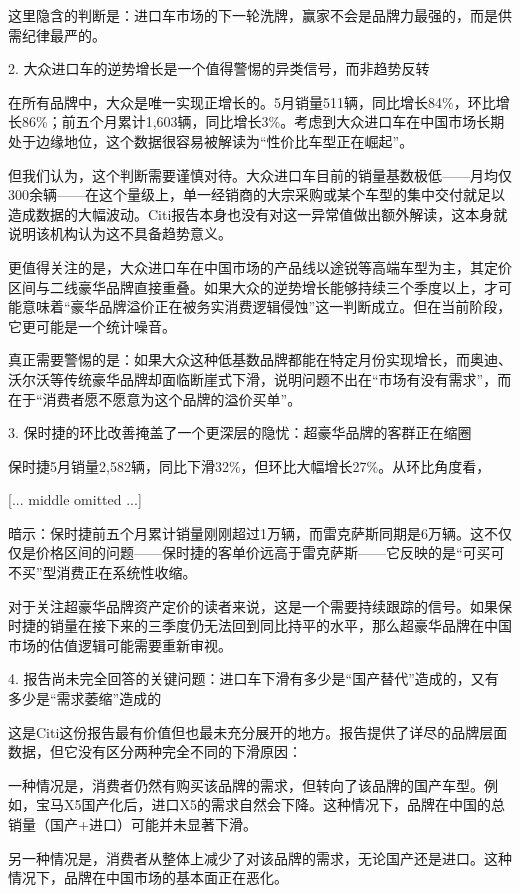 \documentclass[11pt]{ctexart}
\begin{document}
这里隐含的判断是：进口车市场的下一轮洗牌，赢家不会是品牌力最强的，而是供需纪律最严的。

2. 大众进口车的逆势增长是一个值得警惕的异类信号，而非趋势反转

在所有品牌中，大众是唯一实现正增长的。5月销量511辆，同比增长84\%，环比增长86\%；前五个月累计1,603辆，同比增长3\%。考虑到大众进口车在中国市场长期处于边缘地位，这个数据很容易被解读为“性价比车型正在崛起”。

但我们认为，这个判断需要谨慎对待。大众进口车目前的销量基数极低——月均仅300余辆——在这个量级上，单一经销商的大宗采购或某个车型的集中交付就足以造成数据的大幅波动。Citi报告本身也没有对这一异常值做出额外解读，这本身就说明该机构认为这不具备趋势意义。

更值得关注的是，大众进口车在中国市场的产品线以途锐等高端车型为主，其定价区间与二线豪华品牌直接重叠。如果大众的逆势增长能够持续三个季度以上，才可能意味着“豪华品牌溢价正在被务实消费逻辑侵蚀”这一判断成立。但在当前阶段，它更可能是一个统计噪音。

真正需要警惕的是：如果大众这种低基数品牌都能在特定月份实现增长，而奥迪、沃尔沃等传统豪华品牌却面临断崖式下滑，说明问题不出在“市场有没有需求”，而在于“消费者愿不愿意为这个品牌的溢价买单”。

3. 保时捷的环比改善掩盖了一个更深层的隐忧：超豪华品牌的客群正在缩圈

保时捷5月销量2,582辆，同比下滑32\%，但环比大幅增长27\%。从环比角度看，

[... middle omitted ...]

暗示：保时捷前五个月累计销量刚刚超过1万辆，而雷克萨斯同期是6万辆。这不仅仅是价格区间的问题——保时捷的客单价远高于雷克萨斯——它反映的是“可买可不买”型消费正在系统性收缩。

对于关注超豪华品牌资产定价的读者来说，这是一个需要持续跟踪的信号。如果保时捷的销量在接下来的三季度仍无法回到同比持平的水平，那么超豪华品牌在中国市场的估值逻辑可能需要重新审视。

4. 报告尚未完全回答的关键问题：进口车下滑有多少是“国产替代”造成的，又有多少是“需求萎缩”造成的

这是Citi这份报告最有价值但也最未充分展开的地方。报告提供了详尽的品牌层面数据，但它没有区分两种完全不同的下滑原因：

一种情况是，消费者仍然有购买该品牌的需求，但转向了该品牌的国产车型。例如，宝马X5国产化后，进口X5的需求自然会下降。这种情况下，品牌在中国的总销量（国产+进口）可能并未显著下滑。

另一种情况是，消费者从整体上减少了对该品牌的需求，无论国产还是进口。这种情况下，品牌在中国市场的基本面正在恶化。
\end{document}
